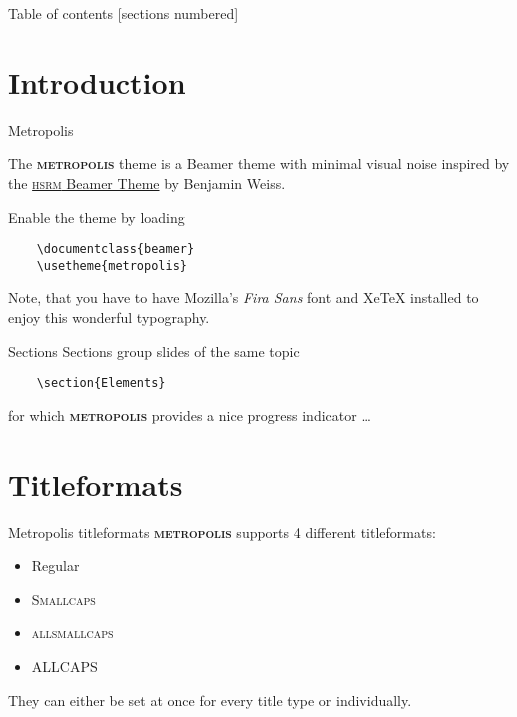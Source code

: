 \documentclass[10pt]{beamer}
\newcommand{\themename}{\textbf{\textsc{metropolis}}\xspace}
\begin{document}
\iffalse

\begin{frame}{Table of contents}
  [sections numbered]
  \tableofcontents%
\end{frame}

\section[Intro]{Introduction}

\begin{frame}[fragile]{Metropolis}

  The \themename theme is a Beamer theme with minimal visual noise
  inspired by the \href{https://github.com/hsrmbeamertheme/hsrmbeamertheme}{\textsc{hsrm} Beamer
  Theme} by Benjamin Weiss.

  Enable the theme by loading

  \begin{verbatim}    \documentclass{beamer}
    \usetheme{metropolis}\end{verbatim}

  Note, that you have to have Mozilla's \emph{Fira Sans} font and XeTeX
  installed to enjoy this wonderful typography.
\end{frame}
\begin{frame}[fragile]{Sections}
  Sections group slides of the same topic

  \begin{verbatim}    \section{Elements}\end{verbatim}

  for which \themename provides a nice progress indicator \ldots
  
\end{frame}

\section{Titleformats}

\begin{frame}{Metropolis titleformats}
	\themename supports 4 different titleformats:
	\begin{itemize}
		\item Regular
		\item \textsc{Smallcaps}
		\item \textsc{allsmallcaps}
		\item ALLCAPS
	\end{itemize}
	They can either be set at once for every title type or individually.
\end{frame}
\end{document}

